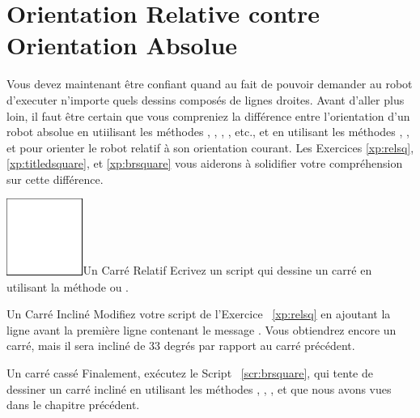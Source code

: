 \documentclass[a4paper,10pt,twoside]{book}
\begin{document}
\section{Orientation Relative contre Orientation Absolue}
Vous devez maintenant \^etre confiant quand au fait de pouvoir demander au robot d'executer n'importe quels dessins 
compos\'es de lignes droites. Avant d'aller plus loin, il faut \^etre certain que vous compreniez la diff\'erence entre 
l'orientation d'un robot absolue en utiilisant les m\'ethodes , , , , etc., et en utilisant 
les m\'ethodes , , et  pour orienter le robot relatif  \`a son orientation courant. 
Les Exercices \ref{xp:relsq}, \ref{xp:titledsquare}, et \ref{xp:brsquare} vous aiderons \`a solidifier votre compr\'ehension sur cette diff\'erence.



\begin{exofigwithsize}[0.7]{\includegraphics[width=2.5cm]{ChTurnfirstSquare}}{Un Carr\'e Relatif}\label{xp:relsq}
Ecrivez un script qui dessine un carr\'e en utilisant la m\'ethode  ou . 
\end{exofigwithsize}


\begin{exonofigtitle}{Un Carr\'e Inclin\'e}\label{xp:titledsquare}
Modifiez votre script de l'Exercice ~\ref{xp:relsq} en ajoutant la ligne  avant la premi\`ere ligne contenant le message . Vous obtiendrez encore un carr\'e, mais il sera inclin\'e de 33 degr\'es par rapport au carr\'e pr\'ec\'edent. 
\end{exonofigtitle}




\begin{exonofigtitle}{Un carr\'e cass\'e}\label{xp:brsquare}
Finalement, ex\'ecutez le Script ~\ref{scr:brsquare}, qui tente de dessiner un carr\'e inclin\'e en utilisant les m\'ethodes , , , et  que nous avons vues dans le chapitre pr\'ec\'edent. 
\end{exonofigtitle}
\end{document}
